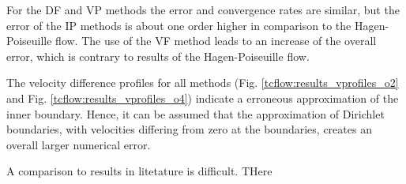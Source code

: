 For the DF and VP methods the error and convergence rates are similar,
but the error of the IP methods is about one order higher in comparison to the Hagen-Poiseuille flow.
The use of the VF method leads to an increase of the overall error, which is contrary to results of the Hagen-Poiseuille flow.

The velocity difference profiles for all methods (Fig. \ref{tcflow:results_vprofiles_o2} and Fig. \ref{tcflow:results_vprofiles_o4})
indicate a erroneous approximation of the inner boundary.
Hence, it can be assumed that the approximation of Dirichlet boundaries, with velocities differing from zero at the boundaries,
creates an overall larger numerical error.

A comparison to results in litetature is difficult.
THere


%
%


